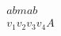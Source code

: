 \documentclass{amsart}
\begin{document}
\thispagestyle{empty}

\begin{align*}
abmab & \\
v_1 v_2 v_3 v_4 A
\end{align*}
\end{document}
